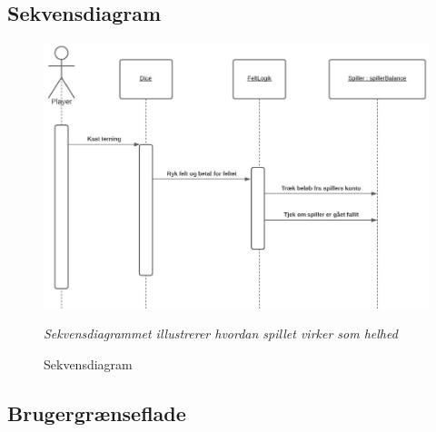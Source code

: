 \subsection{Sekvensdiagram}
    \begin{figure}[H]
        \centering
        \includegraphics[width=15cm]{figures/systemSekvensDiagram.JPG}
        \caption{Sekvensdiagram}
        \emph{Sekvensdiagrammet illustrerer hvordan spillet virker som helhed}
    \end{figure}

\subsection{Brugergrænseflade}
